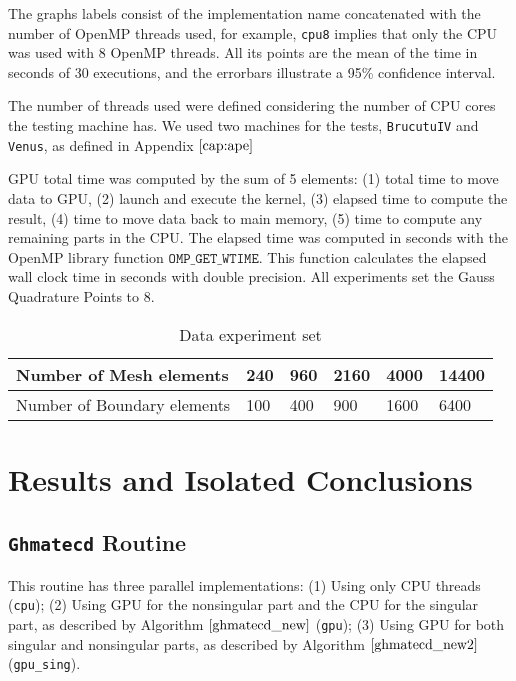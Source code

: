 The graphs labels consist of the implementation name concatenated with the number of OpenMP threads used, 
for example, \texttt{cpu8} implies that only the CPU was used with 8 OpenMP threads. All its points 
are the mean of the time in seconds of 30 executions, and the errorbars illustrate a 95\% confidence interval.

The number of threads used were defined considering the number of CPU cores the testing machine has. 
We used two machines for the tests, \texttt{BrucutuIV} and \texttt{Venus}, as defined in Appendix $\ref{cap:ape}$

GPU total time was computed by the sum of 5 elements: 
(1) total time to move data to GPU, (2) launch and execute the kernel, (3) elapsed time 
to compute the result, (4) time to move data back to main memory, (5) time to compute 
any remaining parts in the CPU. 
The elapsed time was computed in seconds with the OpenMP library function 
$\texttt{OMP\_GET\_WTIME}$. This function calculates the elapsed wall clock time in seconds 
with double precision. All experiments set the Gauss Quadrature Points to 8.

\begin{table}[]
\centering
\caption{Data experiment set}
\label{experiments}
\begin{tabular}{|l|l|l|l|l|l|}
\hline
Number of Mesh elements     & 240 & 960 & 2160 & 4000 & 14400\\ \hline
Number of Boundary elements & 100 & 400 & 900  & 1600 & 6400\\ \hline
\end{tabular}
\end{table}

\section{Results and Isolated Conclusions}

\subsection{\texttt{Ghmatecd} Routine}

This routine has three parallel implementations: (1) Using only CPU threads 
(\texttt{cpu}); (2) Using GPU for the nonsingular part and the CPU for the 
singular part, as described by Algorithm $\ref{ghmatecd_new}$ (\texttt{gpu}); 
(3) Using GPU for both singular and nonsingular parts, as described by Algorithm 
$\ref{ghmatecd_new2}$ (\texttt{gpu\_sing}).                                    


